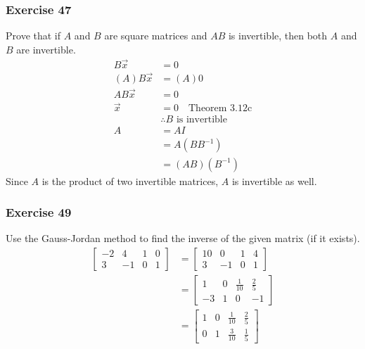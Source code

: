 \documentclass[letterpaper, 12pt]{math}
\begin{document}
\subsubsection*{Exercise 47}
Prove that if \( A \) and \( B \) are square matrices and \( AB \) is
invertible, then both \( A \) and \( B \) are invertible. \\
\begin{align*}
  B\vec{x} &= 0 \\
  (A)B\vec{x} &= (A)0 \\
  AB\vec{x} &= 0 \\
  \vec{x} &= 0 \quad \text{Theorem 3.12c} \\
  & \therefore B \text{ is invertible} \\
  A &= AI \\
  &= A(BB^{-1}) \\
  &= (AB)(B^{-1})
\end{align*}
Since \( A \) is the product of two invertible matrices, \( A \) is invertible
as well.

\subsubsection*{Exercise 49}
Use the Gauss-Jordan method to find the inverse of the given matrix (if it
exists).
\begin{align*}
  \begin{bmatrix}
    -2 & 4 & 1 & 0 \\
    3 & -1 & 0 & 1
  \end{bmatrix} &= \begin{bmatrix}
    10 & 0 & 1 & 4 \\
    3 & -1 & 0 & 1
  \end{bmatrix} \\
  &= \begin{bmatrix}
    1 & 0 & \frac{1}{10} & \frac{2}{5} \\[0.25em]
    -3 & 1 & 0 & -1
  \end{bmatrix} \\
  &= \begin{bmatrix}
    1 & 0 & \frac{1}{10} & \frac{2}{5} \\[0.25em]
    0 & 1 & \frac{3}{10} & \frac{1}{5}
  \end{bmatrix}
\end{align*}
\end{document}
